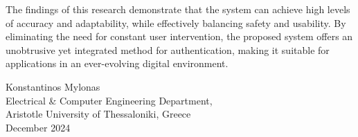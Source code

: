 {\begin{sloppypar}
    The findings of this research demonstrate that the system can achieve high levels of accuracy and adaptability, while effectively balancing safety and usability. By eliminating the need for constant user intervention, the proposed system offers an unobtrusive yet integrated method for authentication, making it suitable for applications in an ever-evolving digital environment. 

\end{sloppypar}
\begin{flushright}
  \vspace{2cm}
  Konstantinos Mylonas
  \\
  Electrical \& Computer Engineering Department,
  \\
  Aristotle University of Thessaloniki, Greece
  \\
  December 2024
\end{flushright}

}
